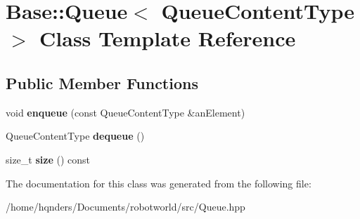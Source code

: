 \hypertarget{class_base_1_1_queue}{}\section{Base\+:\+:Queue$<$ Queue\+Content\+Type $>$ Class Template Reference}
\label{class_base_1_1_queue}
\subsection*{Public Member Functions}
\begin{DoxyCompactItemize}
\item 
void {\bfseries enqueue} (const Queue\+Content\+Type \&an\+Element)\hypertarget{class_base_1_1_queue_a2f737b5dc4b04016bc529fdac46a59a2}{}\label{class_base_1_1_queue_a2f737b5dc4b04016bc529fdac46a59a2}

\item 
Queue\+Content\+Type {\bfseries dequeue} ()\hypertarget{class_base_1_1_queue_a256b99ec524acf877586ae7450dfcb13}{}\label{class_base_1_1_queue_a256b99ec524acf877586ae7450dfcb13}

\item 
size\+\_\+t {\bfseries size} () const \hypertarget{class_base_1_1_queue_a1facbc77b95d2dc9c897f2893604b816}{}\label{class_base_1_1_queue_a1facbc77b95d2dc9c897f2893604b816}

\end{DoxyCompactItemize}


The documentation for this class was generated from the following file\+:\begin{DoxyCompactItemize}
\item 
/home/hqnders/\+Documents/robotworld/src/Queue.\+hpp\end{DoxyCompactItemize}
